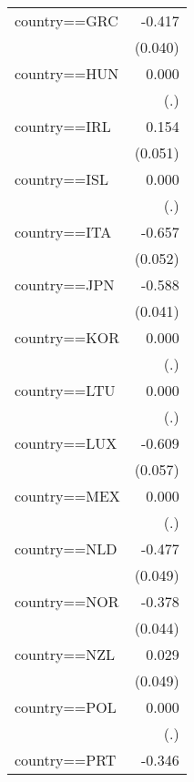\begin{table}[htbp]
\begin{tabular}{l*{1}{D{.}{.}{-1}}}
\addlinespace
country==GRC        &      -0.417\sym{***}\\
                    &     (0.040)         \\
\addlinespace
country==HUN        &       0.000         \\
                    &         (.)         \\
\addlinespace
country==IRL        &       0.154\sym{***}\\
                    &     (0.051)         \\
\addlinespace
country==ISL        &       0.000         \\
                    &         (.)         \\
\addlinespace
country==ITA        &      -0.657\sym{***}\\
                    &     (0.052)         \\
\addlinespace
country==JPN        &      -0.588\sym{***}\\
                    &     (0.041)         \\
\addlinespace
country==KOR        &       0.000         \\
                    &         (.)         \\
\addlinespace
country==LTU        &       0.000         \\
                    &         (.)         \\
\addlinespace
country==LUX        &      -0.609\sym{***}\\
                    &     (0.057)         \\
\addlinespace
country==MEX        &       0.000         \\
                    &         (.)         \\
\addlinespace
country==NLD        &      -0.477\sym{***}\\
                    &     (0.049)         \\
\addlinespace
country==NOR        &      -0.378\sym{***}\\
                    &     (0.044)         \\
\addlinespace
country==NZL        &       0.029         \\
                    &     (0.049)         \\
\addlinespace
country==POL        &       0.000         \\
                    &         (.)         \\
\addlinespace
country==PRT        &      -0.346\sym{***}\\

\end{tabular}
\end{table}
